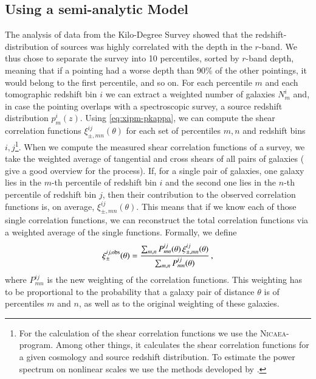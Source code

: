 \subsection{Using a semi-analytic Model}
The analysis of data from the Kilo-Degree Survey showed that the redshift-distribution of sources was highly correlated with the depth in the $r$-band. We thus chose to separate the survey into 10 percentiles, sorted by $r$-band depth, meaning that if a pointing had a worse depth than 90\% of the other pointings, it would belong to the first percentile, and so on. For each percentile $m$ and each tomographic redshift bin $i$ we can extract a weighted number of galaxies $N^i_m$ and, in case the pointing overlaps with a spectroscopic survey, a source redshift distribution $p^i_m(z)$. Using \eqref{eq:xipm-pkappa}, we can compute the shear correlation functions $\xi_{\pm,mn}^{ij}(\theta)$ for each set of percentiles $m,n$ and redshift bins $i,j$\footnote{For the calculation of the shear correlation functions we use the \textsc{Nicaea}-program. Among other things, it calculates the shear correlation functions for a given cosmology and source redshift distribution. To estimate the power spectrum on nonlinear scales we use the methods developed by \citet{2012ApJ...761..152T}.}. When we compute the measured shear correlation functions of a survey, we take the weighted average of tangential and cross shears of all pairs of galaxies (\citet{2017MNRAS.465.1454H} give a good overview for the process). If, for a single pair of galaxies, one galaxy lies in the $m$-th percentile of redshift bin $i$ and the second one lies in the $n$-th percentile of redshift bin $j$, then their contribution to the observed correlation functions is, on average, $\xi_{\pm,mn}^{ij}(\theta)$. This means that if we know each of those single correlation functions, we can reconstruct the total correlation functions via a weighted average of the single functions. Formally, we define \[
\xi_\pm^{ij,\rm{obs}}(\theta) = \frac{\sum_{m,n} P_{mn}^{ij}(\theta)\,\xi_{\pm,mn}^{ij}(\theta)}{\sum_{m,n} P_{mn}^{ij}(\theta)}\, ,
\label{eq:def_xiobs}
\]
where $P_{mn}^{ij}$ is the new weighting of the correlation functions. This weighting has to be proportional to the probability that a galaxy pair of distance $\theta$ is of percentiles $m$ and $n$, as well as to the original weighting of these galaxies.

